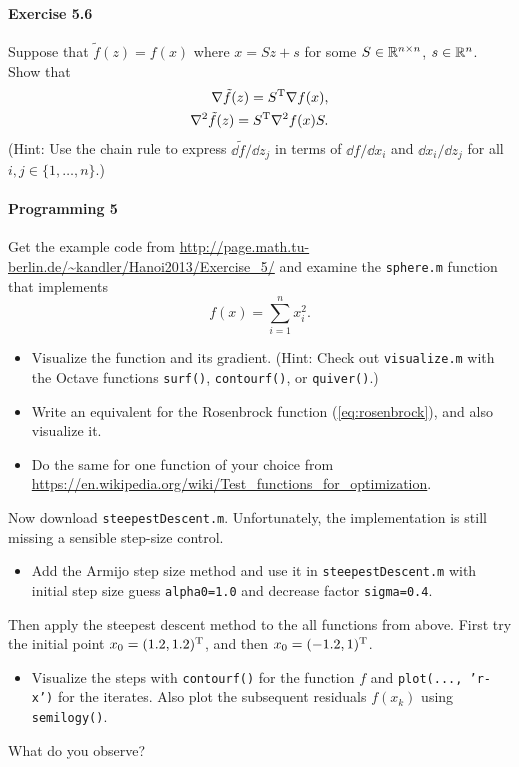 \paragraph{Exercise 5.6} %
Suppose that $\tilde{f}(z) = f(x)$ where $x=Sz + s$ for some $S\in\mathbb{R}^{n\times
n}$, $s\in\mathbb{R}^n$. Show that
\[
  \begin{split}
  \nabla\tilde{f}(z) = S^{\text{\upshape T}} \nabla f(x),\\
  \nabla^2\tilde{f}(z) = S^{\text{\upshape T}} \nabla^2 f(x) S.
\end{split}
\]
(Hint: Use the chain rule to express $\dd \tilde{f}/\dd z_j$ in terms of $\dd f/\dd x_i$ and $\dd x_i/\dd z_j$ for all $i, j\in\{1,\dots,n\}$.)

\paragraph{Programming 5}  %
Get the example code from \url{http://page.math.tu-berlin.de/~kandler/Hanoi2013/Exercise_5/} and examine the \texttt{sphere.m} function that implements
\[
  f(x) = \sum_{i=1}^n x_i^2.
\]
\begin{itemize}
  \item Visualize the function and its gradient. (Hint: Check out
    \texttt{visualize.m} with the Octave functions \texttt{surf()},
    \texttt{contourf()}, or \texttt{quiver()}.)
  \item Write an equivalent for the Rosenbrock function (\ref{eq:rosenbrock}),
    and also visualize it.
  \item Do the same for one function of your choice from
    \url{https://en.wikipedia.org/wiki/Test_functions_for_optimization}.
\end{itemize}

Now download \texttt{steepestDescent.m}. Unfortunately, the implementation is
still missing a sensible step-size control.
\begin{itemize}
  \item Add the Armijo step size method and use it in
    \texttt{steepestDescent.m} with initial step size guess
    \texttt{alpha0=1.0} and decrease factor \texttt{sigma=0.4}.
\end{itemize}
Then apply the steepest descent method to the all functions from above.  First
try the initial point $x_0=(1.2, 1.2)^{\text{\upshape T}}$, and then $x_0=(-1.2, 1)^{\text{\upshape T}}$.
\begin{itemize}
  \item Visualize the steps with \texttt{contourf()} for the function $f$ and
    \texttt{plot(..., 'r-x')} for the iterates. Also plot the subsequent
    residuals $f(x_k)$ using \texttt{semilogy()}.
\end{itemize}
What do you observe?

